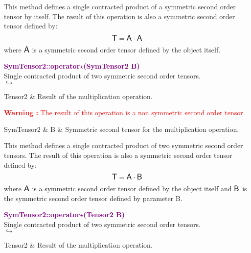 This method defines a single contracted product of a symmetric second order tensor by itself.
The result of this operation is also a symmetric second order tensor defined by:
\begin{equation*}
\mbox{\large\ensuremath{\mathsf{T}}} = \mbox{\large\ensuremath{\mathsf{A}}} \cdot \mbox{\large\ensuremath{\mathsf{A}}}
\end{equation*}
where $\mbox{\large\ensuremath{\mathsf{A}}}$ is a symmetric second order tensor defined by the object itself.

\textcolor{purple}{\textbf{SymTensor2::operator$\star$(SymTensor2 B)}}\label{SymTensor2::operator*(SymTensor2 B)}\\
Single contracted product of two symmetric second order tensors.\\ \hspace*{5mm}$\hookrightarrow$
\vspace*{-2em}\begin{tcolorbox}[grow to left by=-1cm, width=\textwidth-1cm,myArgs,tabularx={l|R}]
Tensor2 & Result of the multiplication operation.
\end{tcolorbox}

\hspace*{10mm}\textcolor{red}{\textbf{Warning :}  The result of this operation is a non symmetric second order tensor.}

\begin{tcolorbox}[width=\textwidth,myArgs,tabularx={ll|R}]
SymTensor2 & B & Symmetric second tensor for the multiplication operation.
\end{tcolorbox}

This method defines a single contracted product of two symmetric second order tensors.
The result of this operation is also a symmetric second order tensor defined by:
\begin{equation*}
\mbox{\large\ensuremath{\mathsf{T}}} = \mbox{\large\ensuremath{\mathsf{A}}} \cdot \mbox{\large\ensuremath{\mathsf{B}}}
\end{equation*}
where $\mbox{\large\ensuremath{\mathsf{A}}}$ is a symmetric second order tensor defined by the object itself and $\mbox{\large\ensuremath{\mathsf{B}}}$ is the symmetric second order tensor defined by parameter B.

\textcolor{purple}{\textbf{SymTensor2::operator$\star$(Tensor2 B)}}\label{SymTensor2::operator*(Tensor2 B)}\\
Single contracted product of two symmetric second order tensors.\\ \hspace*{5mm}$\hookrightarrow$
\vspace*{-2em}\begin{tcolorbox}[grow to left by=-1cm, width=\textwidth-1cm,myArgs,tabularx={l|R}]
Tensor2 & Result of the multiplication operation.
\end{tcolorbox}

